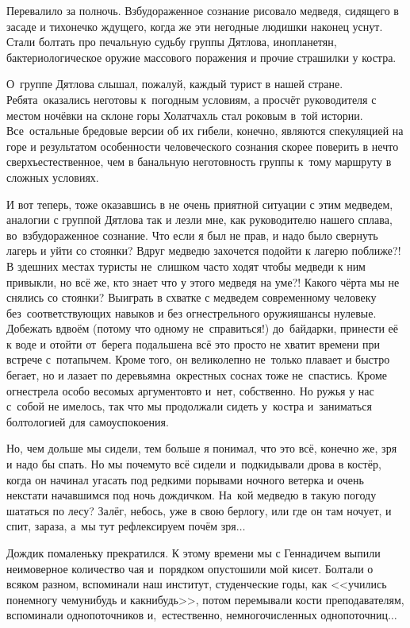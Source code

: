 Перевалило за полночь. Взбудораженное сознание рисовало медведя, сидящего в засаде и тихонечко ждущего, когда же эти негодные людишки наконец уснут. Стали болтать про печальную судьбу группы Дятлова, инопланетян, бактериологическое оружие массового поражения и прочие страшилки у костра. 

О~группе Дятлова слышал, пожалуй, каждый турист в нашей стране. Ребята~оказались неготовы к~погодным условиям, а просчёт руководителя с местом ночёвки на склоне горы Холатчахль стал роковым в~той истории. Все~остальные бредовые версии об их гибели, конечно, являются спекуляцией на горе и результатом особенности человеческого сознания скорее поверить в нечто сверхъестественное, чем в банальную неготовность группы к~тому маршруту в сложных условиях. 

И вот теперь, тоже оказавшись в не очень приятной ситуации с этим медведем, аналогии с группой Дятлова так и лезли мне, как руководителю нашего сплава, во~взбудораженное сознание. Что если я был не прав, и надо было свернуть лагерь и уйти со стоянки? Вдруг медведю захочется подойти к лагерю поближе?! В здешних местах туристы не~слишком часто ходят чтобы медведи к ним привыкли, но всё же, кто знает что у этого медведя на уме?! Какого чёрта мы не снялись со стоянки? Выиграть в схватке с медведем современному человеку без~соответствующих навыков и без огнестрельного оружия\mdash шансы нулевые. Добежать вдвоём (потому что одному не~справиться!) до~байдарки, принести её к воде и отойти от~берега подальше\mdash на всё это просто не хватит времени при встрече с~потапычем. Кроме того, он великолепно не~только плавает и быстро бегает, но и лазает по деревьям\mdash на~окрестных соснах тоже не~спастись. Кроме огнестрела особо весомых аргументов\sdash то и~нет, собственно. Но ружья у нас с~собой не имелось, так что мы продолжали сидеть у~костра и~заниматься болтологией для самоуспокоения.

Но, чем дольше мы сидели, тем больше я понимал, что это всё, конечно же, зря и надо бы спать. Но мы почему\sdash то всё сидели и~подкидывали дрова в костёр, когда он начинал угасать под редкими порывами ночного ветерка и очень некстати начавшимся под ночь дождичком. На~кой медведю в такую погоду шататься по лесу? Залёг, небось, уже в свою берлогу, или где он там ночует, и спит, зараза, а~мы тут рефлексируем почём зря$\ldots$ 

Дождик помаленьку прекратился. К этому времени мы с Геннадичем выпили неимоверное количество чая и~порядком опустошили мой кисет. Болтали о всяком разном, вспоминали наш институт, студенческие годы, как <<учились понемногу чему\sdash нибудь и как\sdash нибудь>>, потом перемывали кости преподавателям, вспоминали однопоточников и,~естественно, немногочисленных однопоточниц$\ldots$

